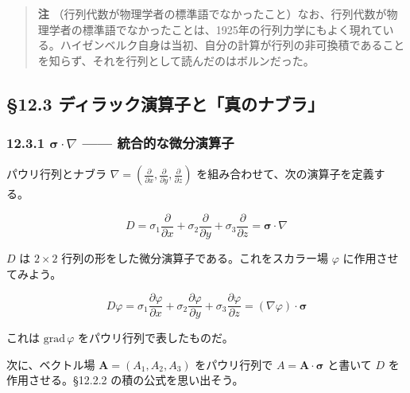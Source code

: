 \documentclass[a4paper,12pt,openany]{book}
\begin{document}
\begin{quote}
\textbf{注}
（行列代数が物理学者の標準語でなかったこと）なお、行列代数が物理学者の標準語でなかったことは、1925年の行列力学にもよく現れている。ハイゼンベルク自身は当初、自分の計算が行列の非可換積であることを知らず、それを行列として読んだのはボルンだった。
\end{quote}

\par\vspace{0.35em}\par

\hypertarget{ux30c7ux30a3ux30e9ux30c3ux30afux6f14ux7b97ux5b50ux3068ux771fux306eux30caux30d6ux30e9}{%
\subsection{§12.3
ディラック演算子と「真のナブラ」}\label{ux30c7ux30a3ux30e9ux30c3ux30afux6f14ux7b97ux5b50ux3068ux771fux306eux30caux30d6ux30e9}}

\hypertarget{bmsigmacdotnabla-ux7d71ux5408ux7684ux306aux5faeux5206ux6f14ux7b97ux5b50}{%
\subsubsection{\texorpdfstring{12.3.1 \(\bm{\sigma}\!\cdot\!\nabla\)
——
統合的な微分演算子}{12.3.1 \textbackslash bm\{\textbackslash sigma\}\textbackslash!\textbackslash cdot\textbackslash!\textbackslash nabla —— 統合的な微分演算子}}\label{bmsigmacdotnabla-ux7d71ux5408ux7684ux306aux5faeux5206ux6f14ux7b97ux5b50}}

パウリ行列とナブラ
\(\nabla = (\frac{\partial}{\partial x}, \frac{\partial}{\partial y}, \frac{\partial}{\partial z})\)
を組み合わせて、次の演算子を定義する。

\[D = \sigma_1\frac{\partial}{\partial x} + \sigma_2\frac{\partial}{\partial y} + \sigma_3\frac{\partial}{\partial z} = \bm{\sigma}\!\cdot\!\nabla\]

\(D\) は \(2\times2\) 行列の形をした微分演算子である。これをスカラー場
\(\varphi\) に作用させてみよう。

\[D\varphi = \sigma_1\frac{\partial\varphi}{\partial x} + \sigma_2\frac{\partial\varphi}{\partial y} + \sigma_3\frac{\partial\varphi}{\partial z} = (\nabla\varphi)\!\cdot\!\bm{\sigma}\]

これは \(\mathrm{grad}\,\varphi\) をパウリ行列で表したものだ。

次に、ベクトル場 \(\mathbf{A} = (A_1, A_2, A_3)\) をパウリ行列で
\(A = \mathbf{A}\!\cdot\!\bm{\sigma}\) と書いて \(D\)
を作用させる。§12.2.2 の積の公式を思い出そう。
\end{document}
